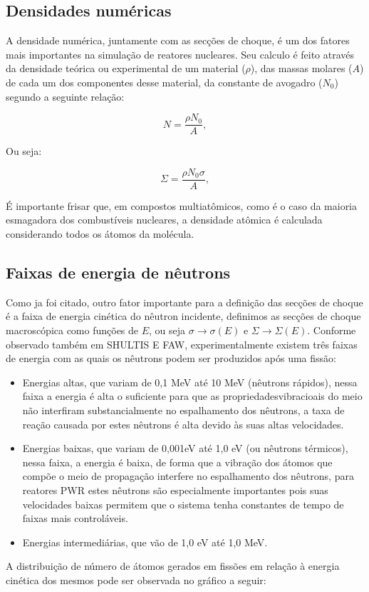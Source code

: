 \documentclass[
	12pt,				%
	openany,			%
	twoside,			%
	a4paper,			%
	english,			%
	french,				%
	spanish,			%
	brazil				%
	]{abntex2}
\begin{document}
\subsection{Densidades numéricas}

A densidade numérica, juntamente com as secções de choque, é um dos fatores mais importantes na simulação de reatores nucleares. Seu calculo é feito através da densidade teórica ou experimental de um material ($\rho$), das massas molares ($A$) de cada um dos componentes desse material, da constante de avogadro ($N_{0}$) segundo a seguinte relação:

\begin{equation}
N=\frac{\rho N_{0}}{A},
\end{equation}

Ou seja:

\begin{equation}
\Sigma=\frac{\rho N_{0}\sigma}{A},
\end{equation}

É importante frisar que, em compostos multiatômicos, como é o caso da maioria esmagadora dos combustíveis nucleares, a densidade atômica é calculada considerando todos os átomos da molécula.

\subsection{Faixas de energia de nêutrons}

Como ja foi citado, outro fator importante para a definição das secções de choque é a faixa de energia cinética do nêutron incidente, definimos as secções de choque macroscópica como funções de $E$, ou seja $\sigma\rightarrow\sigma(E)$ e $\Sigma\rightarrow\Sigma(E)$. Conforme observado também em SHULTIS E FAW, experimentalmente existem três faixas de energia com as quais os nêutrons podem ser produzidos após uma fissão\cite{10fundamentos}:
\begin{itemize}
\item Energias altas, que variam de 0,1 MeV até 10 MeV (nêutrons rápidos), nessa faixa a energia é alta o suficiente para que as propriedadesvibracioais do meio não interfiram substancialmente no espalhamento dos nêutrons, a taxa de reação causada por estes nêutrons é alta devido às suas altas velocidades.
\item Energias baixas, que variam de 0,001eV até 1,0 eV (ou nêutrons térmicos), nessa faixa, a energia é baixa, de forma que a vibração dos átomos que compõe o meio de propagação interfere no espalhamento dos nêutrons, para reatores PWR estes nêutrons são especialmente importantes pois suas velocidades baixas permitem que o sistema tenha constantes de tempo de faixas mais controláveis. 
\item Energias intermediárias, que vão de 1,0 eV até 1,0 MeV.
\end{itemize}
A distribuição de número de átomos gerados em fissões em relação à energia cinética dos mesmos pode ser observada no gráfico a seguir:
\end{document}
